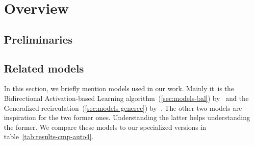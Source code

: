 



\section{Overview}
\label{sec:overview} 

\subsection{Preliminaries}
\label{sec:theory} 

 



\subsection{Related models}
\label{sec:overview-models}  

In this section, we briefly mention models used in our work. Mainly it~is the Bidirectional Activation-based Learning algorithm~(\ref{sec:models-bal}) by~\citet{farkas2013bal} and the Generalized recirculation~(\ref{sec:models-generec}) by~\citet{o1996bio}. The other two models are inspiration for the two former ones. Understanding the latter helps understanding the former. We compare these models to our specialized versions in table~\ref{tab:results-cmp-auto4}. 










 
